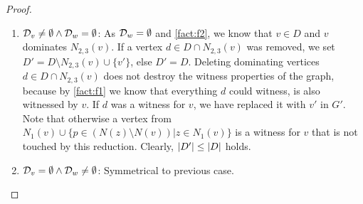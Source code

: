 \begin{proof}
\begin{enumerate}
\begin{enumerate}
            \item  $ \mathcal{D}_{v} \neq \emptyset  \wedge \mathcal{D}_{w} = \emptyset$: As $\mathcal{D}_{w} = \emptyset$ and \cref{fact:f2}, we know that $v \in D$ and $v$ dominates $N_{2,3}(v)$. 
            If a vertex $d \in D \cap N_{2,3}(v)$ was removed, we set $D' = D \setminus N_{2,3}(v) \cup \{v'\}$, else $D' = D$.
            Deleting dominating vertices $d \in D \cap N_{2,3}(v)$ does not destroy the witness properties of the graph, because by \cref{fact:f1} we know that everything $d$ could witness, is also witnessed by $v$. 
            If $d$ was a witness for $v$, we have replaced it with $v'$ in $G'$.
            Note that otherwise a vertex from $N_1(v) \cup \{ p \in (N(z) \setminus N(v)) | z \in N_1(v) \}$ is a witness for $v$ that is not touched by this reduction. Clearly, $\abs{D'} \leq \abs{D}$ holds.
            \item  $ \mathcal{D}_{v} = \emptyset  \wedge \mathcal{D}_{w} \neq  \emptyset $: Symmetrical to previous case.
        \end{enumerate}


\end{enumerate}
\end{proof}
